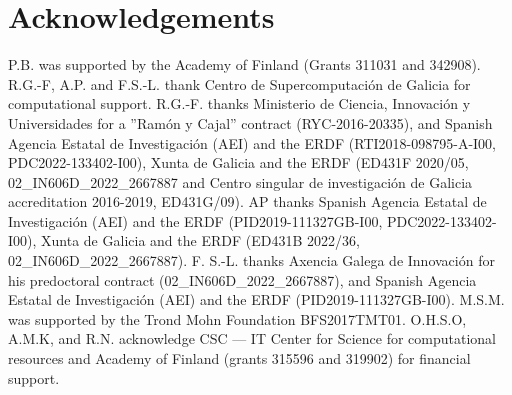 \documentclass[fleqn,10pt]{wlscirep}
\begin{document}








\section*{Acknowledgements}

P.B. was supported by the Academy of Finland (Grants 311031 and 342908).
R.G.-F, A.P. and F.S.-L. thank Centro de Supercomputación de Galicia for computational support.
R.G.-F. thanks Ministerio de Ciencia, Innovaci{\'o}n y Universidades for a ''Ram{\'o}n y Cajal'' contract (RYC-2016-20335), and Spanish Agencia Estatal de Investigaci{\'o}n (AEI) and the ERDF (RTI2018-098795-A-I00, PDC2022-133402-I00), Xunta de Galicia and the ERDF (ED431F 2020/05, 02\_IN606D\_2022\_2667887 and Centro singular de investigaci{\'o}n de Galicia accreditation 2016-2019, ED431G/09). 
AP thanks Spanish Agencia Estatal de Investigaci{\'o}n (AEI) and the ERDF (PID2019-111327GB-I00, PDC2022-133402-I00), Xunta de Galicia and the ERDF (ED431B 2022/36, 02\_IN606D\_2022\_2667887).
F. S.-L. thanks Axencia Galega de Innovaci{\'o}n for his predoctoral contract (02\_IN606D\_2022\_2667887), and Spanish Agencia Estatal de Investigaci{\'o}n (AEI) and the ERDF (PID2019-111327GB-I00). 
M.S.M. was supported by the Trond Mohn Foundation BFS2017TMT01.
O.H.S.O, A.M.K, and R.N. acknowledge CSC --- IT Center for Science for computational resources and Academy of Finland (grants 315596 and 319902) for financial support.
\end{document}
